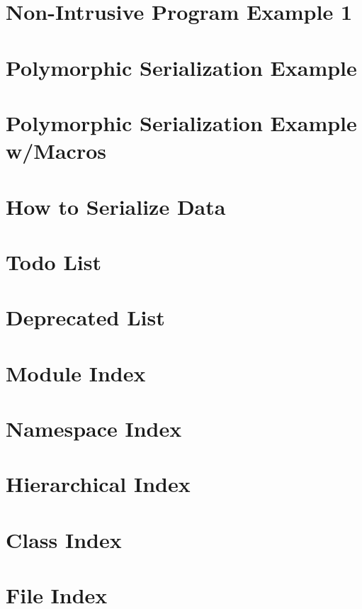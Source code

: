 \documentclass[twoside]{book}
\newcommand{\+}{\discretionary{\mbox{\scriptsize$\hookleftarrow$}}{}{}}
\begin{document}
\chapter{Non-\/\+Intrusive Program Example 1}
\label{ckpt_learn_ex1_nonintrusive}

\chapter{Polymorphic Serialization Example}
\label{ckpt_learn_example_polymorphic}

\chapter{Polymorphic Serialization Example w/\+Macros}
\label{ckpt_learn_example_polymorphic_macro}

\chapter{How to Serialize Data}
\label{ckpt_learn_serialize}

\chapter{Todo List}
\label{todo}

\chapter{Deprecated List}
\label{deprecated}

\chapter{Module Index}

\chapter{Namespace Index}

\chapter{Hierarchical Index}

\chapter{Class Index}

\chapter{File Index}

\end{document}
